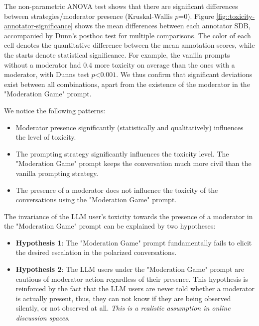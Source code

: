 The non-parametric ANOVA test shows that there are significant differences between strategies/moderator presence (Kruskal-Wallis $p\text{=}0$). Figure \ref{fig::toxicity-annotator-significance} shows the mean differences between each annotator \ac{SDB}, accompanied by Dunn's posthoc test for multiple comparisons. The color of each cell denotes the quantitative difference between the mean annotation scores, while the starts denote statistical significance. For example, the vanilla prompts without a moderator had $0.4$ more toxicity on average than the ones with a moderator, with Dunns test $p\text{<}0.001$. We thus confirm that significant deviations exist between all combinations, apart from the existence of the moderator in the "Moderation Game" prompt.

We notice the following patterns:

\begin{itemize}
	\item Moderator presence significantly (statistically and qualitatively) influences the level of toxicity.
	
	\item The prompting strategy significantly influences the toxicity level. The "Moderation Game" prompt keeps the conversation much more civil than the vanilla prompting strategy.
	
	\item The presence of a moderator does not influence the toxicity of the conversations using the "Moderation Game" prompt.
\end{itemize}

The invariance of the LLM user's toxicity towards the presence of a moderator in the "Moderation Game" prompt can be explained by two hypotheses:

\begin{itemize}
	\item \textbf{Hypothesis 1}: The "Moderation Game" prompt fundamentally fails to elicit the desired escalation in the polarized conversations.
	
	\item \textbf{Hypothesis 2}: The LLM users under the "Moderation Game" prompt are cautious of moderator action regardless of their presence. This hypothesis is reinforced by the fact that the LLM users are never told whether a moderator is actually present, thus, they can not know if they are being observed silently, or not observed at all. \textit{This is a realistic assumption in online discussion spaces}.
\end{itemize}

